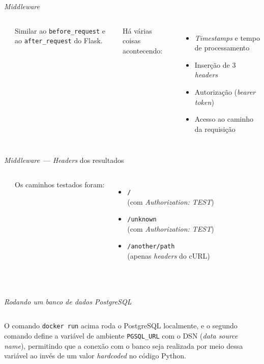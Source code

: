 \documentclass[utf8]{beamer}
\begin{document}
\begin{frame}[fragile]{\emph{Middleware}}
  \begin{columns}
    \inputminted{python}{07_middlewares.py}

    \fontsize{.8em}{1.2em}\selectfont
    Similar ao \texttt{before_request}
    e ao \texttt{after_request}
    do Flask.

    \vspace{1em}
    Há várias coisas acontecendo:
    \fontsize{.9em}{1em}\selectfont
    \begin{itemize}
      \item \emph{Timestamps} e tempo de processamento
      \item Inserção de $3$ \emph{headers}
      \item Autorização (\emph{bearer token})
      \item Acesso ao caminho da requisição
    \end{itemize}
  \end{columns}
\end{frame}


\begin{frame}[fragile]{\emph{Middleware}~---
                       \emph{Headers} dos resultados}
  \begin{columns}
    \inputminted{raw}{07_headers_200.txt}
    \fontsize{.8em}{1.2em}\selectfont
    Os caminhos testados foram:
    \begin{itemize}
      \item \texttt{/} \\ (com \emph{Authorization: TEST})
      \item \texttt{/unknown} \\ (com \emph{Authorization: TEST})
      \item \texttt{/another/path} \\ (apenas \emph{headers} do cURL)
    \end{itemize}
  \end{columns}
  \begin{columns}
    \inputminted{raw}{07_headers_404.txt}
    \inputminted{raw}{07_headers_401.txt}
  \end{columns}
\end{frame}


\begin{frame}[fragile]{\emph{Rodando um banco de dados PostgreSQL}}
  \inputminted{shell}{08_database.sh}
  \vfill
  O comando \texttt{docker run} acima
  roda o PostgreSQL localmente,
  e o segundo comando define
  a variável de ambiente \texttt{PGSQL\_URL}
  com o DSN (\emph{data source name}),
  permitindo que a conexão com o banco
  seja realizada por meio dessa variável
  ao invés de um valor \emph{hardcoded} no código Python.
\end{frame}
\end{document}
